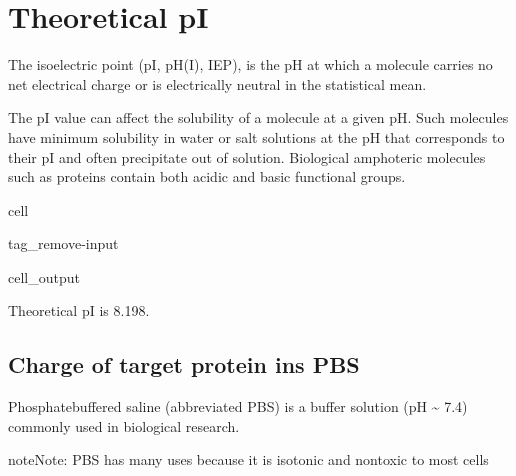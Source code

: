 \documentclass[letterpaper,10pt,english]{jupyterBook}
\begin{document}
\section{Theoretical pI}
\label{\detokenize{ipynb/chapter1:theoretical-pi}}
\sphinxAtStartPar
The isoelectric point (pI, pH(I), IEP), is the pH at which a molecule carries no net electrical charge or is electrically neutral in the statistical mean.

\sphinxAtStartPar
The pI value can affect the solubility of a molecule at a given pH. Such molecules have minimum solubility in water or salt solutions at the pH that corresponds to their pI and often precipitate out of solution. Biological amphoteric molecules such as proteins contain both acidic and basic functional groups.

\begin{sphinxuseclass}{cell}
\begin{sphinxuseclass}{tag_remove-input}\begin{sphinxVerbatimOutput}

\begin{sphinxuseclass}{cell_output}
\begin{sphinxVerbatim}[commandchars=\\\{\}]
Theoretical pI is 8.198.
\end{sphinxVerbatim}

\end{sphinxuseclass}\end{sphinxVerbatimOutput}

\end{sphinxuseclass}
\end{sphinxuseclass}

\subsection{Charge of target protein ins PBS}
\label{\detokenize{ipynb/chapter1:charge-of-target-protein-ins-pbs}}
\sphinxAtStartPar
Phosphate\sphinxhyphen{}buffered saline (abbreviated PBS) is a buffer solution (pH \textasciitilde{} 7.4) commonly used in biological research.

\begin{sphinxadmonition}{note}{Note:}
\sphinxAtStartPar
PBS has many uses because it is isotonic and non\sphinxhyphen{}toxic to most cells
\end{sphinxadmonition}
\end{document}
